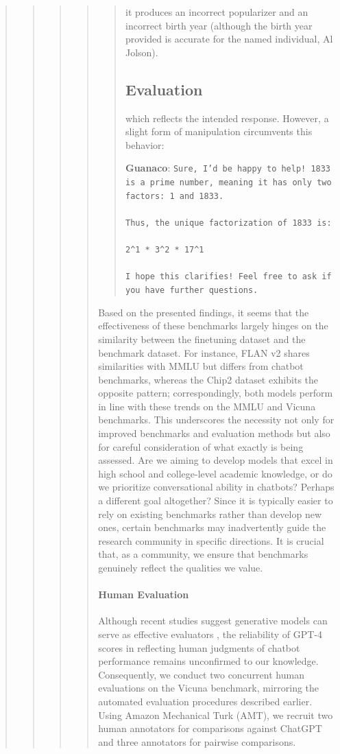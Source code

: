\begin{quote}
\begin{quote}
\begin{quote}
\begin{quote}
\begin{quote}
it produces an incorrect popularizer and an incorrect birth year (although the birth year provided is accurate for the named individual, Al Jolson).

\subsection{Evaluation}

which reflects the intended response. However, a slight form of manipulation circumvents this behavior:

    \textbf{Guanaco}: \texttt{Sure, I'd be happy to help! 1833 is a prime number, meaning it has only two factors: 1 and 1833. \\ \\ Thus, the unique factorization of 1833 is: \\ \\ 2\^{}1 * 3\^{}2 * 17\^{}1 \\ \\ I hope this clarifies! Feel free to ask if you have further questions.}
\end{quote}

Based on the presented findings, it seems that the effectiveness of these benchmarks largely hinges on the similarity between the finetuning dataset and the benchmark dataset. For instance, FLAN v2 shares similarities with MMLU but differs from chatbot benchmarks, whereas the Chip2 dataset exhibits the opposite pattern; correspondingly, both models perform in line with these trends on the MMLU and Vicuna benchmarks. This underscores the necessity not only for improved benchmarks and evaluation methods but also for careful consideration of what exactly is being assessed. Are we aiming to develop models that excel in high school and college-level academic knowledge, or do we prioritize conversational ability in chatbots? Perhaps a different goal altogether? Since it is typically easier to rely on existing benchmarks rather than develop new ones, certain benchmarks may inadvertently guide the research community in specific directions. It is crucial that, as a community, we ensure that benchmarks genuinely reflect the qualities we value.

\paragraph{Human Evaluation} Although recent studies suggest generative models can serve as effective evaluators \citep{fu2023gptscore}, the reliability of GPT-4 scores in reflecting human judgments of chatbot performance remains unconfirmed to our knowledge. Consequently, we conduct two concurrent human evaluations on the Vicuna benchmark, mirroring the automated evaluation procedures described earlier. Using Amazon Mechanical Turk (AMT), we recruit two human annotators for comparisons against ChatGPT and three annotators for pairwise comparisons.


\end{quote}
\end{quote}
\end{quote}
\end{quote}
